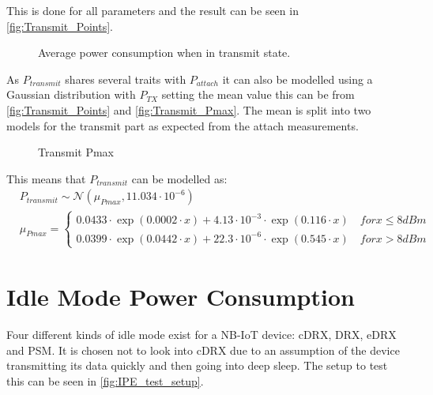 This is done for all parameters and the result can be seen in \autoref{fig:Transmit_Points}.

\begin{figure}[H]
\centering
\begin{minipage}{0.48\textwidth}
\resizebox{\textwidth}{!}{
}
\end{minipage}
\hfill
\begin{minipage}{0.48\textwidth}
\resizebox{\textwidth}{!}{
}
\end{minipage}
\caption{Average power consumption when in transmit state.}
\label{fig:Transmit_Points}
\end{figure}

As $P_{transmit}$ shares several traits with $P_{attach}$ it can also be modelled using a Gaussian distribution with $P_{TX}$ setting the mean value this can be from \autoref{fig:Transmit_Points} and \autoref{fig:Transmit_Pmax}. The mean is split into two models for the transmit part as expected from the attach measurements. 

\begin{figure}[H]
\centering
{}
\resizebox{0.7\textwidth}{!}{
}
\caption{Transmit Pmax}
\label{fig:Transmit_Pmax}
\end{figure}

This means that $P_{transmit}$ can be modelled as:
\begin{align}
&P_{transmit} \sim \mathcal{N}(\mu_{Pmax},11.034\cdot 10^{-6}) \\ \nonumber
&\mu_{Pmax} = \begin{cases} 0.0433\cdot\exp{(0.0002\cdot x)} + 4.13\cdot10^{-3}\cdot\exp{(0.116\cdot x)} \quad for x \leq 8 dBm \\
0.0399\cdot\exp{(0.0442\cdot x)} + 22.3\cdot10^{-6}\cdot\exp{(0.545\cdot x)} \quad for x > 8 dBm \end{cases}
\end{align}


\section{Idle Mode Power Consumption}
Four different kinds of idle mode exist for a NB-IoT device: \gls{cDRX}, \gls{DRX}, \gls{eDRX} and \gls{PSM}. It is chosen not to look into \gls{cDRX} due to an assumption of the device transmitting its data quickly and then going into deep sleep. The setup to test this can be seen in \autoref{fig:IPE_test_setup}.


